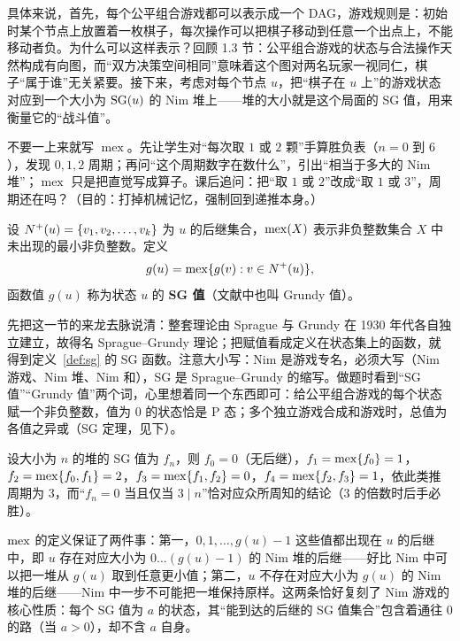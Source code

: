 具体来说，首先，每个公平组合游戏都可以表示成一个 DAG，游戏规则是：初始时某个节点上放置着一枚棋子，每次操作可以把棋子移动到任意一个出点上，不能移动者负。为什么可以这样表示？回顾 1.3 节：公平组合游戏的状态与合法操作天然构成有向图，而“双方决策空间相同”意味着这个图对两名玩家一视同仁，棋子“属于谁”无关紧要。接下来，考虑对每个节点 $u$，把“棋子在 $u$ 上”的游戏状态对应到一个大小为 $\operatorname{SG}(u)$ 的 Nim 堆上——堆的大小就是这个局面的 SG 值，用来衡量它的“战斗值”。

\begin{teach}[怎样想到 SG 值？]
不要一上来就写 $\operatorname{mex}$。先让学生对“每次取 $1$ 或 $2$ 颗”手算胜负表（$n=0$ 到 $6$），发现 $0,1,2$ 周期；再问“这个周期数字在数什么”，引出“相当于多大的 Nim 堆”；$\operatorname{mex}$ 只是把直觉写成算子。课后追问：把“取 $1$ 或 $2$”改成“取 $1$ 或 $3$”，周期还在吗？（目的：打掉机械记忆，强制回到递推本身。）
\end{teach}
\begin{definition}\label{def:sg}
设 $N^+(u)=\{v_1,v_2,\ldots,v_k\}$ 为 $u$ 的后继集合，$\operatorname{mex}(X)$ 表示非负整数集合 $X$ 中未出现的最小非负整数。定义
\[
 g(u)=\operatorname{mex}\{g(v):v\in N^+(u)\},
\]
函数值 $g(u)$ 称为状态 $u$ 的 \textbf{SG 值}（文献中也叫 Grundy 值）。
\end{definition}

先把这一节的来龙去脉说清：整套理论由 Sprague 与 Grundy 在 1930 年代各自独立建立，故得名 Sprague--Grundy 理论；把赋值看成定义在状态集上的函数，就得到定义~\ref{def:sg} 的 SG 函数。注意大小写：Nim 是游戏专名，必须大写（Nim 游戏、Nim 堆、Nim 和），SG 是 Sprague--Grundy 的缩写。做题时看到“SG 值”“Grundy 值”两个词，心里想着同一个东西即可：给公平组合游戏的每个状态赋一个非负整数，值为 $0$ 的状态恰是 P 态；多个独立游戏合成和游戏时，总值为各值之异或（SG 定理，见下）。

\begin{example}
设大小为 $n$ 的堆的 SG 值为 $f_n$，则 $f_0=0$（无后继），$f_1=\operatorname{mex}\{f_0\}=1$，$f_2=\operatorname{mex}\{f_0,f_1\}=2$，$f_3=\operatorname{mex}\{f_1,f_2\}=0$，$f_4=\operatorname{mex}\{f_2,f_3\}=1$，依此类推周期为 $3$，而“$f_n=0$ 当且仅当 $3\mid n$”恰对应众所周知的结论（$3$ 的倍数时后手必胜）。
\end{example}

$\operatorname{mex}$ 的定义保证了两件事：第一，$0,1,\ldots,g(u)-1$ 这些值都出现在 $u$ 的后继中，即 $u$ 存在对应大小为 $0\ldots(g(u)-1)$ 的 Nim 堆的后继——好比 Nim 中可以把一堆从 $g(u)$ 取到任意更小值；第二，$u$ 不存在对应大小为 $g(u)$ 的 Nim 堆的后继——Nim 中一步不可能把一堆保持原样。这两条恰好复刻了 Nim 游戏的核心性质：每个 SG 值为 $a$ 的状态，其“能到达的后继的 SG 值集合”包含着通往 $0$ 的路（当 $a>0$），却不含 $a$ 自身。

